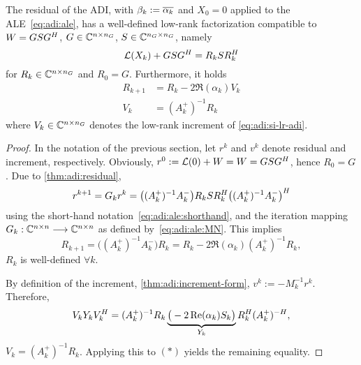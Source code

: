 \begin{theorem}
  The residual of the \ac{ADI},
  with $\beta_k := \conj{\alpha_k}$ and $X_0=0$ applied to the \ac{ALE}~\eqref{eq:adi:ale},
  has a well-defined low-rank factorization compatible to $W = GSG^H$,
  $G\in\mathbb{C}^{n\times n_G}$, $S\in\mathbb{C}^{n_G\times n_G}$, namely
  \begin{equation*}
    \operatorname{\mathcal L}(X_k) + G S G^H = R_k S R_k^H
  \end{equation*}
  for $R_k \in\mathbb{C}^{n\times n_G}$ and $R_0 = G$.
  Furthermore, it holds
  \begin{align*}
    R_{k+1} &= R_k - 2\Re(\alpha_k) V_k \\
    V_k &= (A_k^+)^{-1} R_k
  \end{align*}
  where $V_k \in\mathbb{C}^{n\times n_G}$ denotes the low-rank increment of \eqref{eq:adi:si-lr-adi}.
\end{theorem}
\begin{proof}
  In the notation of the previous section,
  let $r^k$ and $v^k$ denote residual and increment, respectively.
  Obviously, $r^0 := \operatorname{\mathcal L}(0) + W = W = GSG^H$, hence $R_0 = G$.
  Due to \autoref{thm:adi:residual},
  \begin{equation*}
    r^{k+1}
    = G_k r^k
    = \big( (A_k^+)^{-1} A_k^- \big)
    R_k S R_k^H
    \big( (A_k^+)^{-1} A_k^- \big)^H
  \end{equation*}
  using the short-hand notation~\eqref{eq:adi:ale:shorthand},
  and the iteration mapping $G_k : \mathbb{C}^{n\times n}\longrightarrow\mathbb{C}^{n\times n}$ as defined by~\eqref{eq:adi:ale:MN}.
  This implies
  \begin{equation*}
  \tag{$\ast$}
    R_{k+1}
    = \big( (A_k^+)^{-1} A_k^- \big) R_k
    = R_k - 2\Re(\alpha_k) (A_k^+)^{-1} R_k
    ,
  \end{equation*}
  \ie $R_k$ is well-defined $\forall k$.

  By definition of the increment,
  \cf \autoref{thm:adi:increment-form},
  $v^k := -M_k^{-1} r^k$.
  Therefore,
  \begin{equation*}
    V_k Y_k V_k^H
    = (A_k^+)^{-1} R_k
    \underbrace{
      \big( -2 \operatorname{Re}(\alpha_k) S_k \big)
    }_{Y_k}
    R_k^H (A_k^+)^{-H}
    ,
  \end{equation*}
  \ie $V_k = (A_k^+)^{-1} R_k$.
  Applying this to $(\ast)$ yields the remaining equality.
\end{proof}


